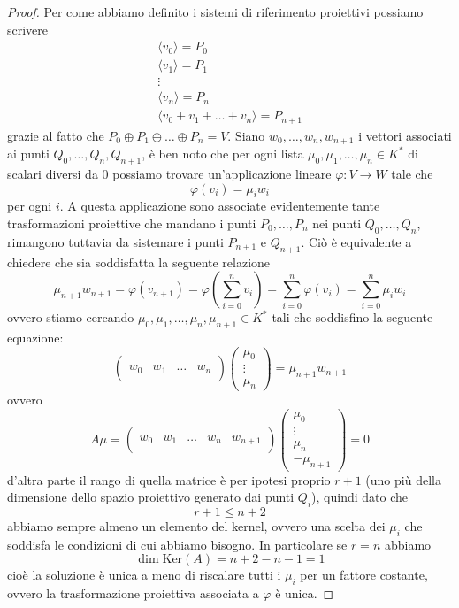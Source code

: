 \documentclass[11pt]{scrartcl}
\renewcommand{\ker}[1]{\text{Ker}\left(#1\right)}
\begin{document}
   	 \begin{proof}
   	 	Per come abbiamo definito i sistemi di riferimento proiettivi possiamo scrivere 
   	 	\begin{gather*}
   	 		\langle v_0\rangle=P_0 \\
   	 		\langle v_1\rangle=P_1 \\
   	 		\vdots \\
   	 		\langle v_n\rangle=P_n \\
   	 		\langle v_0+v_1+\dots+v_n\rangle =P_{n+1}
   	 	\end{gather*}
   	 	grazie al fatto che $P_0\oplus P_1\oplus \dots\oplus P_n=V$. Siano $w_0,\dots,w_n,w_{n+1}$ i vettori associati ai punti $Q_0,\dots,Q_{n},Q_{n+1}$, è ben noto che per ogni lista $\mu_0,\mu_1,\dots,\mu_n\in K^*$ di scalari diversi da $0$ possiamo trovare un'applicazione lineare $\varphi:V\to W$ tale che
   	 	$$\varphi(v_i)=\mu_iw_i$$
   	 	per ogni $i$. A questa applicazione sono associate evidentemente tante trasformazioni proiettive che mandano i punti $P_0,\dots,P_n$ nei punti $Q_0,\dots,Q_n$, rimangono tuttavia da sistemare i punti $P_{n+1}$ e $Q_{n+1}$. Ciò è equivalente a chiedere che sia soddisfatta la seguente relazione
   	 	$$\mu_{n+1}w_{n+1}=\varphi(v_{n+1})=\varphi\left(\sum_{i=0}^{n}v_i\right)=\sum_{i=0}^{n}\varphi(v_i)=\sum_{i=0}^{n}\mu_i w_i$$
   	 	ovvero stiamo cercando $\mu_0,\mu_1,\dots,\mu_n,\mu_{n+1}\in K^*$ tali che soddisfino la seguente equazione:
   	 	$$
   	 	\left(
   	 	\begin{array}{c|c|c|c}
   	 		&&&\\
   	 		w_0 & w_1 & \dots & w_n\\
   	 		&&&
   	 	\end{array}
   	 	\right)\begin{pmatrix}
   	 		\mu_0 \\
   	 		\vdots \\
   	 		\mu_n
   	 	\end{pmatrix}=\mu_{n+1}w_{n+1}
   	 	$$
   	 	ovvero
   	 	$$A\mu=
   	 	\left(
   	 	\begin{array}{c|c|c|c|c}
   	 		&&&\\
   	 		w_0 & w_1 & \dots & w_n & w_{n+1}\\
   	 		&&&
   	 	\end{array}
   	 	\right)
   	 	\begin{pmatrix}
   	 	\mu_0 \\
   	 	\vdots \\
   	 	\mu_n \\
   	 	-\mu_{n+1}
   	 	\end{pmatrix}=0
   	 	$$
   	 	d'altra parte il rango di quella matrice è per ipotesi proprio $r+1$ (uno più della dimensione dello spazio proiettivo generato dai punti $Q_i$), quindi dato che 
   	 	$$r+1\le n+2$$
   	 	abbiamo sempre almeno un elemento del kernel, ovvero una scelta dei $\mu_i$ che soddisfa le condizioni di cui abbiamo bisogno. In particolare se $r=n$ abbiamo
   	 	$$\dim \ker{A}=n+2-n-1=1$$
   	 	cioè la soluzione è unica a meno di riscalare tutti i $\mu_i$ per un fattore costante, ovvero la trasformazione proiettiva associata a $\varphi$ è unica.
   	 \end{proof}
\end{document}

